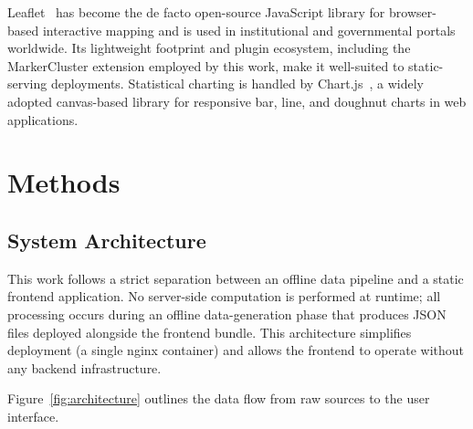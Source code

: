 \documentclass[final,3p,times,twocolumn]{elsarticle}
\begin{document}
Leaflet~\cite{Leaflet} has become the de facto open-source JavaScript library for browser-based interactive mapping and is used in institutional and governmental portals worldwide. Its lightweight footprint and plugin ecosystem, including the MarkerCluster extension employed by this work, make it well-suited to static-serving deployments. Statistical charting is handled by Chart.js~\cite{ChartJS}, a widely adopted canvas-based library for responsive bar, line, and doughnut charts in web applications.

\section{Methods}
\label{sec:methods}

\subsection{System Architecture}

This work follows a strict separation between an offline data pipeline and a static frontend application. No server-side computation is performed at runtime; all processing occurs during an offline data-generation phase that produces JSON files deployed alongside the frontend bundle. This architecture simplifies deployment (a single nginx container) and allows the frontend to operate without any backend infrastructure.

Figure~\ref{fig:architecture} outlines the data flow from raw sources to the user interface.
\end{document}
